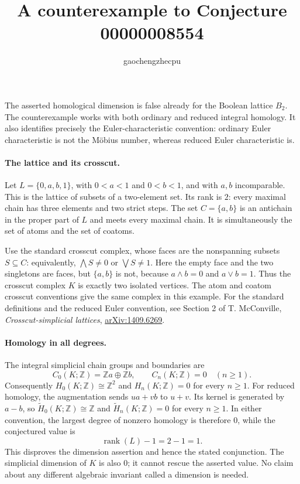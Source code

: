 \documentclass[11pt]{article}
\title{A counterexample to Conjecture 00000008554}
\author{gaochengzhecpu}
\date{}
\begin{document}
\maketitle

The asserted homological dimension is false already for the Boolean lattice
$B_2$.  The counterexample works with both ordinary and reduced integral
homology.  It also identifies precisely the Euler-characteristic convention:
ordinary Euler characteristic is not the M\"obius number, whereas reduced Euler
characteristic is.

\paragraph{The lattice and its crosscut.}
Let $L=\{0,a,b,1\}$, with $0<a<1$ and $0<b<1$, and with $a,b$
incomparable.  This is the lattice of subsets of a two-element set.  Its rank
is $2$: every maximal chain has three elements and two strict steps.
The set $C=\{a,b\}$ is an antichain in the proper part of $L$ and meets
every maximal chain.  It is simultaneously the set of atoms and the set of
coatoms.

Use the standard crosscut complex, whose faces are the nonspanning subsets
$S\subseteq C$: equivalently, $\bigwedge S\ne0$ or $\bigvee S\ne1$.
Here the empty face and the two singletons are faces, but $\{a,b\}$ is not,
because $a\wedge b=0$ and $a\vee b=1$.  Thus the crosscut complex $K$ is
exactly two isolated vertices.  The atom and coatom crosscut conventions give
the same complex in this example.  For the standard definitions and the
reduced Euler convention, see Section 2 of T. McConville,
\emph{Crosscut-simplicial lattices},
\href{https://arxiv.org/abs/1409.6269}{arXiv:1409.6269}.

\paragraph{Homology in all degrees.}
The integral simplicial chain groups and boundaries are
\[
 C_0(K;\mathbb Z)=\mathbb Z a\oplus\mathbb Z b,\qquad
 C_n(K;\mathbb Z)=0\quad(n\ge1).
\]
Consequently $H_0(K;\mathbb Z)\cong\mathbb Z^2$ and
$H_n(K;\mathbb Z)=0$ for every $n\ge1$.
For reduced homology, the augmentation sends $u a+v b$ to $u+v$.
Its kernel is generated by $a-b$, so
$\widetilde H_0(K;\mathbb Z)\cong\mathbb Z$ and
$\widetilde H_n(K;\mathbb Z)=0$ for every $n\ge1$.
In either convention, the largest degree of nonzero homology is therefore
$0$, while the conjectured value is
\[
 \operatorname{rank}(L)-1=2-1=1.
\]
This disproves the dimension assertion and hence the stated conjunction.
The simplicial dimension of $K$ is also $0$; it cannot rescue the asserted
value.  No claim about any different algebraic invariant called a dimension
is needed.
\end{document}
